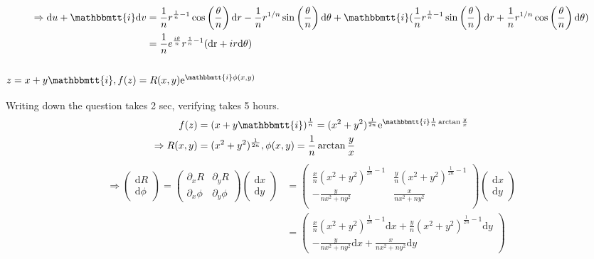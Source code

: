 \documentclass[]{ctexart}
\newcommand{\mi}{\mathbbmtt{i}}
\newcommand{\di}{\mathrm{d}}
\newcommand{\pa}{\partial}
\newcommand{\me}{\mathrm{e}}
\begin{document}
				\begin{equation*}
				\begin{aligned}
					\Rightarrow \di u+\mi \di v
					&=\frac{1}{n}r^{\frac{1}{n}-1} \cos \left(\frac{\theta }{n}\right)\di r-\frac{1}{n}r^{1/n} \sin \left(\frac{\theta }{n}\right)\di \theta+\mi (\frac{1}{n}r^{\frac{1}{n}-1} \sin \left(\frac{\theta }{n}\right)\di r + \frac{1}{n}r^{1/n} \cos \left(\frac{\theta }{n}\right)\di \theta)\\
					&=\frac{1}{n}e^{\frac{i \theta }{n}} r^{\frac{1}{n}-1} (\text{dr}+i  r\text{d}\theta)
				\end{aligned}
				\end{equation*}
				
		\subsubsection{$z=x+y\mi, f(z)=R(x,y)\me ^{\mi \phi (x,y)}$}
			Writing down the question takes 2 sec, verifying takes 5 hours. 
				\begin{equation*}
				\begin{aligned}
					f(z)&=(x+y\mi )^{\frac{1}{n}}=(x^2+y^2)^{\frac{1}{2n}}\me ^{\mi \frac{1}{n}\arctan\frac{y}{x}}\\
					\Rightarrow R(x,y)&=(x^2+y^2)^{\frac{1}{2n}},\phi (x,y)=\frac{1}{n}\arctan\frac{y}{x}
				\end{aligned}
				\end{equation*}
				\begin{equation*}
				\begin{aligned}
					\Rightarrow
					\begin{pmatrix}
						\di R\\
						\di \phi 
					\end{pmatrix}
					=
					\begin{pmatrix}
						\pa_xR & \pa_{y}R\\
						\pa_x\phi & \pa_{y}\phi
					\end{pmatrix}
					\begin{pmatrix}
						\di x\\
						\di y
					\end{pmatrix}
					&=
					\left(
					\begin{array}{cc}
						\frac{x }{n}\left(x^2+y^2\right)^{\frac{1}{2 n}-1} & \frac{y }{n}\left(x^2+y^2\right)^{\frac{1}{2 n}-1} \\
						-\frac{y}{n x^2+n y^2} & \frac{x}{n x^2+n y^2} \\
					\end{array}
					\right)
					\begin{pmatrix}
						\di x\\
						\di y
					\end{pmatrix}\\
					&=
					\begin{pmatrix}
						\frac{x }{n}\left(x^2+y^2\right)^{\frac{1}{2 n}-1}\di x + \frac{y }{n}\left(x^2+y^2\right)^{\frac{1}{2 n}-1}\di y \\
						-\frac{y}{n x^2+n y^2}\di x+ \frac{x}{n x^2+n y^2}\di y
					\end{pmatrix}
				\end{aligned}
				\end{equation*}
\end{document}
